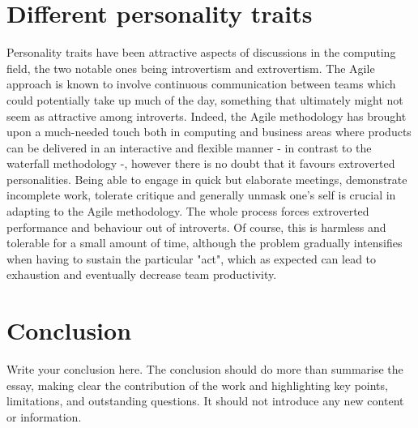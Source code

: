 \documentclass{scrartcl}
\begin{document}
\section{Different personality traits}
Personality traits have been attractive aspects of discussions in the computing field, the two notable ones being introvertism and extrovertism. The Agile approach is known to involve continuous communication between teams which could potentially take up much of the day, something that ultimately might not seem as attractive among introverts. Indeed, the Agile methodology has brought upon a much-needed touch both in computing and business areas where products can be delivered in an interactive and flexible manner - in contrast to the waterfall methodology -, however there is no doubt that it favours extroverted personalities. Being able to engage in quick but elaborate meetings, demonstrate incomplete work, tolerate critique and generally unmask one's self is crucial in adapting to the Agile methodology. The whole process forces extroverted performance and behaviour out of introverts. Of course, this is harmless and tolerable for a small amount of time, although the problem gradually intensifies when having to sustain the particular "act", which as expected can lead to exhaustion and eventually decrease team productivity.

\section{Conclusion}

Write your conclusion here. The conclusion should do more than summarise the essay, making clear the contribution of the work and highlighting key points, limitations, and outstanding questions. It should not introduce any new content or information.\cite{Lehmann}



\end{document}
